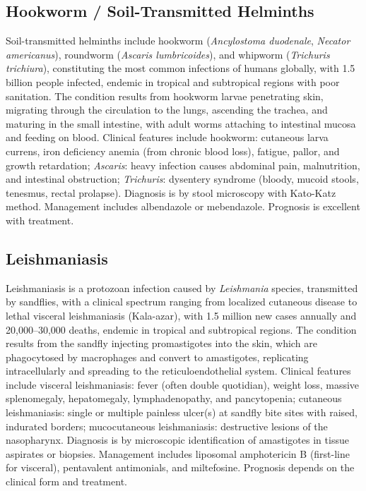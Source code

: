 \subsection{Hookworm / Soil-Transmitted Helminths}
\label{sec:Hookworm Soil-Transmitted Helminths}
Soil-transmitted helminths include hookworm (\textit{Ancylostoma duodenale}, \textit{Necator americanus}), roundworm (\textit{Ascaris lumbricoides}), and whipworm (\textit{Trichuris trichiura}), constituting the most common infections of humans globally, with 1.5 billion people infected, endemic in tropical and subtropical regions with poor sanitation. The condition results from hookworm larvae penetrating skin, migrating through the circulation to the lungs, ascending the trachea, and maturing in the small intestine, with adult worms attaching to intestinal mucosa and feeding on blood. Clinical features include hookworm: cutaneous larva currens, iron deficiency anemia (from chronic blood loss), fatigue, pallor, and growth retardation; \textit{Ascaris}: heavy infection causes abdominal pain, malnutrition, and intestinal obstruction; \textit{Trichuris}: dysentery syndrome (bloody, mucoid stools, tenesmus, rectal prolapse). Diagnosis is by stool microscopy with Kato-Katz method. Management includes albendazole or mebendazole. Prognosis is excellent with treatment.

\subsection{Leishmaniasis}
\label{sec:Leishmaniasis}
Leishmaniasis is a protozoan infection caused by \textit{Leishmania} species, transmitted by sandflies, with a clinical spectrum ranging from localized cutaneous disease to lethal visceral leishmaniasis (Kala-azar), with 1.5 million new cases annually and 20,000--30,000 deaths, endemic in tropical and subtropical regions. The condition results from the sandfly injecting promastigotes into the skin, which are phagocytosed by macrophages and convert to amastigotes, replicating intracellularly and spreading to the reticuloendothelial system. Clinical features include visceral leishmaniasis: fever (often double quotidian), weight loss, massive splenomegaly, hepatomegaly, lymphadenopathy, and pancytopenia; cutaneous leishmaniasis: single or multiple painless ulcer(s) at sandfly bite sites with raised, indurated borders; mucocutaneous leishmaniasis: destructive lesions of the nasopharynx. Diagnosis is by microscopic identification of amastigotes in tissue aspirates or biopsies. Management includes liposomal amphotericin B (first-line for visceral), pentavalent antimonials, and miltefosine. Prognosis depends on the clinical form and treatment.

